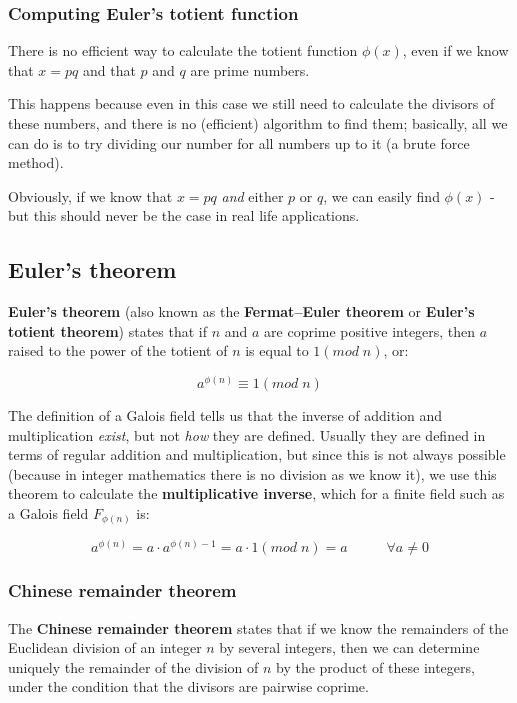 
\subsubsection{Computing Euler's totient function}
There is no efficient way to calculate the totient function $\phi(x)$, even if we know that $x=pq$ and that $p$ and $q$ are prime numbers.

This happens because even in this case we still need to calculate the divisors of these numbers, and there is no (efficient) algorithm to find them; basically, all we can do is to try dividing our number for all numbers up to it (a brute force method).

Obviously, if we know that $x = pq$ \textit{and} either $p$ or $q$, we can easily find $\phi(x)$ - but this should never be the case in real life applications.


\subsection{Euler's theorem}
\textbf{Euler's theorem} (also known as the \textbf{Fermat–Euler theorem} or \textbf{Euler's totient theorem}) states that if $n$ and $a$ are coprime positive integers, then $a$ raised to the power of the totient of $n$ is equal to $1 (mod\; n)$, or:

\begin{equation}
    a^{\phi(n)} \equiv 1 (mod\; n)
\end{equation}

The definition of a Galois field tells us that the inverse of addition and multiplication \textit{exist}, but not \textit{how} they are defined. Usually they are defined in terms of regular addition and multiplication, but since this is not always possible (because in integer mathematics there is no division as we know it), we use this theorem to calculate the \textbf{multiplicative inverse}, which for a finite field such as a Galois field $F_{\phi(n)}$ is:

\begin{equation}
     a^{\phi(n)} = a \cdot  a^{\phi(n)-1} = a \cdot 1 (mod\; n) = a \;\;\;\;\;\;\;\;\;\; \forall a\neq 0
\end{equation}


\subsubsection{Chinese remainder theorem}
The \textbf{Chinese remainder theorem} states that if we know the remainders of the Euclidean division of an integer $n$ by several integers, then we can determine uniquely the remainder of the division of $n$ by the product of these integers, under the condition that the divisors are pairwise coprime.

